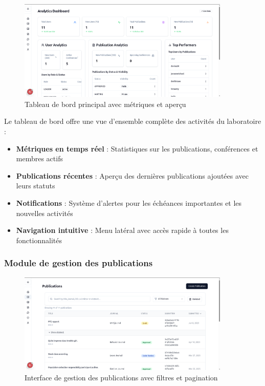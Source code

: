 \documentclass{rapportPfe}
\begin{document}
\begin{figure}[H]
    \centering
    \includegraphics[width=0.9\textwidth]{diagrams/a_ss_08.png}
    \caption{Tableau de bord principal avec métriques et aperçu}
    \label{fig:dashboard}
\end{figure}

Le tableau de bord offre une vue d'ensemble complète des activités du laboratoire :
\begin{itemize}
    \item \textbf{Métriques en temps réel} : Statistiques sur les publications, conférences et membres actifs
    \item \textbf{Publications récentes} : Aperçu des dernières publications ajoutées avec leurs statuts
    \item \textbf{Notifications} : Système d'alertes pour les échéances importantes et les nouvelles activités
    \item \textbf{Navigation intuitive} : Menu latéral avec accès rapide à toutes les fonctionnalités
\end{itemize}

\subsubsection{Module de gestion des publications}

\begin{figure}[H]
    \centering
    \includegraphics[width=0.9\textwidth]{diagrams/a_ss_12.png}
    \caption{Interface de gestion des publications avec filtres et pagination}
    \label{fig:publications}
\end{figure}
\end{document}
